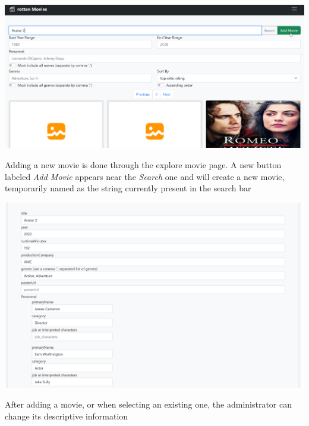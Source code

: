 \begin{center}
\includegraphics[scale=0.45]{../../../images/user_manual/add_new_movie.png} 

\end{center}
\vspace{5pt}

Adding a new movie is done through the explore movie page. A new button labeled \textit{Add Movie} appears near the \textit{Search} one and will create a new movie, temporarily named as the string currently present in the search bar

\begin{center}
\includegraphics[scale=0.45]{../../../images/user_manual/movie_update.png} 

\end{center}
\vspace{5pt}
After adding a movie, or when selecting an existing one, the administrator can change its descriptive information

